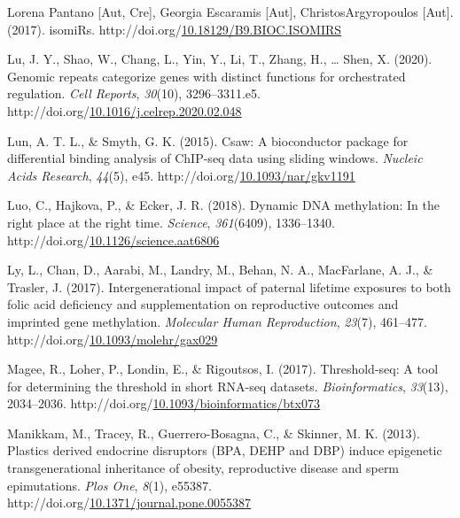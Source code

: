 \documentclass[12pt,twoside]{reedthesis}
\newlength{\cslhangindent}
\newenvironment{CSLReferences}[2] %
 {%
  \setlength{\parindent}{0pt}
  \ifodd #1 \everypar{\setlength{\hangindent}{\cslhangindent}}\ignorespaces\fi
  \ifnum #2 > 0
  \setlength{\parskip}{#2\baselineskip}
  \fi
 }%
 {}
\begin{document}
\begin{CSLReferences}{1}{0}
\leavevmode{}%
Lorena Pantano {[}Aut, Cre{]}, Georgia Escaramis {[}Aut{]}, ChristosArgyropoulos {[}Aut{]}. (2017). isomiRs. http://doi.org/\href{https://doi.org/10.18129/B9.BIOC.ISOMIRS}{10.18129/B9.BIOC.ISOMIRS}

\leavevmode{}%
Lu, J. Y., Shao, W., Chang, L., Yin, Y., Li, T., Zhang, H., \ldots{} Shen, X. (2020). Genomic repeats categorize genes with distinct functions for orchestrated regulation. \emph{Cell Reports}, \emph{30}(10), 3296--3311.e5. http://doi.org/\href{https://doi.org/10.1016/j.celrep.2020.02.048}{10.1016/j.celrep.2020.02.048}

\leavevmode{}%
Lun, A. T. L., \& Smyth, G. K. (2015). Csaw: A bioconductor package for differential binding analysis of ChIP-seq data using sliding windows. \emph{Nucleic Acids Research}, \emph{44}(5), e45. http://doi.org/\href{https://doi.org/10.1093/nar/gkv1191}{10.1093/nar/gkv1191}

\leavevmode{}%
Luo, C., Hajkova, P., \& Ecker, J. R. (2018). Dynamic DNA methylation: In the right place at the right time. \emph{Science}, \emph{361}(6409), 1336--1340. http://doi.org/\href{https://doi.org/10.1126/science.aat6806}{10.1126/science.aat6806}

\leavevmode{}%
Ly, L., Chan, D., Aarabi, M., Landry, M., Behan, N. A., MacFarlane, A. J., \& Trasler, J. (2017). Intergenerational impact of paternal lifetime exposures to both folic acid deficiency and supplementation on reproductive outcomes and imprinted gene methylation. \emph{Molecular Human Reproduction}, \emph{23}(7), 461--477. http://doi.org/\href{https://doi.org/10.1093/molehr/gax029}{10.1093/molehr/gax029}

\leavevmode{}%
Magee, R., Loher, P., Londin, E., \& Rigoutsos, I. (2017). Threshold-seq: A tool for determining the threshold in short RNA-seq datasets. \emph{Bioinformatics}, \emph{33}(13), 2034--2036. http://doi.org/\href{https://doi.org/10.1093/bioinformatics/btx073}{10.1093/bioinformatics/btx073}

\leavevmode{}%
Manikkam, M., Tracey, R., Guerrero-Bosagna, C., \& Skinner, M. K. (2013). Plastics derived endocrine disruptors (BPA, DEHP and DBP) induce epigenetic transgenerational inheritance of obesity, reproductive disease and sperm epimutations. \emph{Plos One}, \emph{8}(1), e55387. http://doi.org/\href{https://doi.org/10.1371/journal.pone.0055387}{10.1371/journal.pone.0055387}


\end{CSLReferences}
\end{document}
